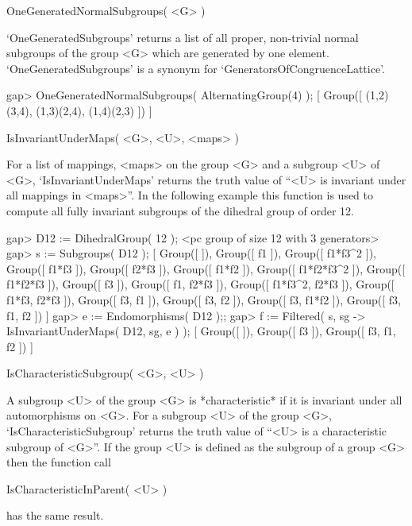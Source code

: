

\>OneGeneratedNormalSubgroups( <G> )

`OneGeneratedSubgroups' returns a list of all proper, non-trivial normal
subgroups of the group <G> which are generated by one element.
`OneGeneratedSubgroups' is a synonym for `GeneratorsOfCongruenceLattice'.

\beginexample
    gap> OneGeneratedNormalSubgroups( AlternatingGroup(4) );
    [ Group([ (1,2)(3,4), (1,3)(2,4), (1,4)(2,3) ]) ]
\endexample



\>IsInvariantUnderMaps( <G>, <U>, <maps> )

For a list of mappings, <maps> on the group <G> and
a subgroup <U> of <G>, `IsInvariantUnderMaps' returns the truth 
value of ``<U> is invariant under all mappings in <maps>''. In the following
example this function is used to compute all fully invariant subgroups of
the dihedral group of order 12.

\beginexample
    gap> D12 := DihedralGroup( 12 );                                        
    <pc group of size 12 with 3 generators>
    gap> s := Subgroups( D12 );
    [ Group([  ]), Group([ f1 ]), Group([ f1*f3^2 ]), Group([ f1*f3 ]), 
      Group([ f2*f3 ]), Group([ f1*f2 ]), Group([ f1*f2*f3^2 ]), 
      Group([ f1*f2*f3 ]), Group([ f3 ]), Group([ f1, f2*f3 ]), 
      Group([ f1*f3^2, f2*f3 ]), Group([ f1*f3, f2*f3 ]), 
      Group([ f3, f1 ]), Group([ f3, f2 ]), Group([ f3, f1*f2 ]), 
      Group([ f3, f1, f2 ]) ]
    gap> e := Endomorphisms( D12 );;                                        
    gap> f := Filtered( s, sg -> IsInvariantUnderMaps( D12, sg, e ) );
    [ Group([  ]), Group([ f3 ]), Group([ f3, f1, f2 ]) ]
\endexample

\>IsCharacteristicSubgroup( <G>, <U> )

A subgroup <U> of the group <G> is *characteristic* if it is invariant under
all automorphisms on <G>. For a subgroup <U> of the group <G>,
`IsCharacteristicSubgroup' returns the truth value of ``<U> is a characteristic
subgroup of <G>''. If the group <U> is defined as the subgroup of a group
<G> then the function call

\>IsCharacteristicInParent( <U> )

has the same result.

